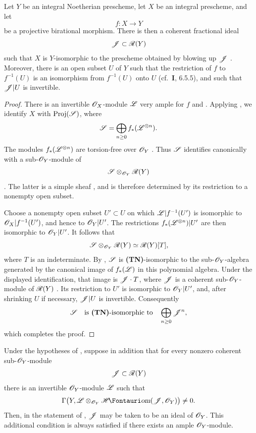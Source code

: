 \begin{proposition}[2.3.5]
\label{III.2.3.5}
Let $Y$ be an integral Noetherian prescheme, let $X$ be an integral prescheme, and let
\[
  f:X\longrightarrow Y
\]
be a projective birational morphism.
There is then a coherent fractional ideal
\[
  \mathscr{J}\subset\mathscr{R}(Y)
\]
 such that $X$ is $Y$-isomorphic to the prescheme obtained by blowing up $\mathscr{J}$ .
Moreover, there is an open subset $U$ of $Y$ such that the restriction of $f$ to $f^{-1}(U)$ is an isomorphism from $f^{-1}(U)$ onto $U$ (cf.\ \textbf{I}, 6.5.5), and such that $\mathscr{J}|U$ is invertible.
\end{proposition}

\begin{proof}
There is an invertible $\mathscr{O}_X$-module $\mathscr{L}$ very ample for $f$  and .
Applying , we identify $X$ with $\operatorname{Proj}(\mathscr{S})$, where
\[
  \mathscr{S}=\bigoplus_{n\geq0}f_*(\mathscr{L}^{\otimes n}).
\]
The modules $f_*(\mathscr{L}^{\otimes n})$ are torsion-free over $\mathscr{O}_Y$ .
Thus $\mathscr{S}$ identifies canonically with a sub-$\mathscr{O}_Y$-module of
\[
  \mathscr{S}\otimes_{\mathscr{O}_Y}\mathscr{R}(Y)
\]
.
The latter is a simple sheaf , and is therefore determined by its restriction to a nonempty open subset.

Choose a nonempty open subset $U'\subset U$ on which $\mathscr{L}|f^{-1}(U')$ is isomorphic to $\mathscr{O}_X|f^{-1}(U')$, and hence to $\mathscr{O}_Y|U'$.
The restrictions $f_*(\mathscr{L}^{\otimes n})|U'$ are then isomorphic to $\mathscr{O}_Y|U'$.
It follows that
\[
  \mathscr{S}\otimes_{\mathscr{O}_Y}\mathscr{R}(Y)
  \simeq\mathscr{R}(Y)[T],
\]
where $T$ is an indeterminate.
By , $\mathscr{S}$ is \textbf{(TN)}-isomorphic to the sub-$\mathscr{O}_Y$-algebra generated by the canonical image of $f_*(\mathscr{L})$ in this polynomial algebra.
Under the displayed identification, that image is $\mathscr{J}\cdot T$, where $\mathscr{J}$ is a coherent sub-$\mathscr{O}_Y$-module of $\mathscr{R}(Y)$ .
Its restriction to $U'$ is isomorphic to $\mathscr{O}_Y|U'$, and, after shrinking $U$ if necessary, $\mathscr{J}|U$ is invertible.
Consequently
\[
  \mathscr{S}\quad\text{is \textbf{(TN)}-isomorphic to}\quad
  \bigoplus_{n\geq0}\mathscr{J}^n,
\]
which completes the proof.
\end{proof}

\begin{corollary}[2.3.6]
\label{III.2.3.6}
Under the hypotheses of , suppose in addition that for every nonzero coherent sub-$\mathscr{O}_Y$-module
\[
  \mathscr{J}\subset\mathscr{R}(Y)
\]
there is an invertible $\mathscr{O}_Y$-module $\mathscr{L}$ such that
\[
  \Gamma\bigl(Y,\sh{L}\otimes_{\sh{O}_Y}
  \shHom(\sh{J},\sh{O}_Y)\bigr)\neq0.
\]
Then, in the statement of , $\mathscr{J}$ may be taken to be an ideal of $\mathscr{O}_Y$.
This additional condition is always satisfied if there exists an ample $\mathscr{O}_Y$-module.
\end{corollary}

